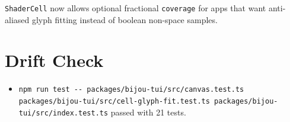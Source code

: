 \texttt{S\allowbreak{}h\allowbreak{}a\allowbreak{}d\allowbreak{}e\allowbreak{}r\allowbreak{}C\allowbreak{}e\allowbreak{}l\allowbreak{}l} now allows optional fractional \texttt{c\allowbreak{}o\allowbreak{}v\allowbreak{}e\allowbreak{}r\allowbreak{}a\allowbreak{}g\allowbreak{}e} for apps that want anti-aliased glyph fitting instead of boolean non-space samples.

\section{Drift Check}\label{record-162-drift-check}

\begin{itemize}
\tightlist
\item
  \texttt{n\allowbreak{}p\allowbreak{}m\allowbreak{} \allowbreak{}r\allowbreak{}u\allowbreak{}n\allowbreak{} \allowbreak{}t\allowbreak{}e\allowbreak{}s\allowbreak{}t\allowbreak{} \allowbreak{}-\allowbreak{}-\allowbreak{} \allowbreak{}p\allowbreak{}a\allowbreak{}c\allowbreak{}k\allowbreak{}a\allowbreak{}g\allowbreak{}e\allowbreak{}s\allowbreak{}/\allowbreak{}b\allowbreak{}i\allowbreak{}j\allowbreak{}o\allowbreak{}u\allowbreak{}-\allowbreak{}t\allowbreak{}u\allowbreak{}i\allowbreak{}/\allowbreak{}s\allowbreak{}r\allowbreak{}c\allowbreak{}/\allowbreak{}c\allowbreak{}a\allowbreak{}n\allowbreak{}v\allowbreak{}a\allowbreak{}s\allowbreak{}.\allowbreak{}t\allowbreak{}e\allowbreak{}s\allowbreak{}t\allowbreak{}.\allowbreak{}t\allowbreak{}s\allowbreak{} \allowbreak{}p\allowbreak{}a\allowbreak{}c\allowbreak{}k\allowbreak{}a\allowbreak{}g\allowbreak{}e\allowbreak{}s\allowbreak{}/\allowbreak{}b\allowbreak{}i\allowbreak{}j\allowbreak{}o\allowbreak{}u\allowbreak{}-\allowbreak{}t\allowbreak{}u\allowbreak{}i\allowbreak{}/\allowbreak{}s\allowbreak{}r\allowbreak{}c\allowbreak{}/\allowbreak{}c\allowbreak{}e\allowbreak{}l\allowbreak{}l\allowbreak{}-\allowbreak{}g\allowbreak{}l\allowbreak{}y\allowbreak{}p\allowbreak{}h\allowbreak{}-\allowbreak{}f\allowbreak{}i\allowbreak{}t\allowbreak{}.\allowbreak{}t\allowbreak{}e\allowbreak{}s\allowbreak{}t\allowbreak{}.\allowbreak{}t\allowbreak{}s\allowbreak{} \allowbreak{}p\allowbreak{}a\allowbreak{}c\allowbreak{}k\allowbreak{}a\allowbreak{}g\allowbreak{}e\allowbreak{}s\allowbreak{}/\allowbreak{}b\allowbreak{}i\allowbreak{}j\allowbreak{}o\allowbreak{}u\allowbreak{}-\allowbreak{}t\allowbreak{}u\allowbreak{}i\allowbreak{}/\allowbreak{}s\allowbreak{}r\allowbreak{}c\allowbreak{}/\allowbreak{}i\allowbreak{}n\allowbreak{}d\allowbreak{}e\allowbreak{}x\allowbreak{}.\allowbreak{}t\allowbreak{}e\allowbreak{}s\allowbreak{}t\allowbreak{}.\allowbreak{}t\allowbreak{}s} passed with 21 tests.

\end{itemize}
